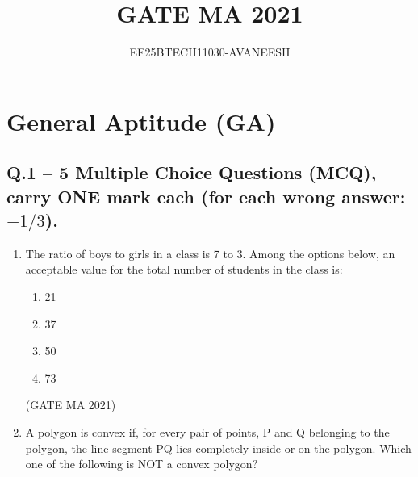 \documentclass[journal,12pt,onecolumn]{IEEEtran}
\title{GATE MA 2021}
\author{EE25BTECH11030-AVANEESH}
\theoremstyle{remark}
\begin{document}
\maketitle

\section*{General Aptitude (GA)}
\subsection*{Q.1 -- 5 Multiple Choice Questions (MCQ), carry ONE mark each (for each wrong answer: $-1/3$).}
\begin{enumerate}
    \item The ratio of boys to girls in a class is 7 to 3. Among the options below, an acceptable value for the total number of students in the class is:
    \begin{enumerate}
        \item 21
        \item 37
        \item 50
        \item 73
    \end{enumerate}
    \hfill(GATE MA 2021)
    \item A polygon is convex if, for every pair of points, P and Q belonging to the polygon, the line segment PQ lies completely inside or on the polygon. Which one of the following is NOT a convex polygon?
\end{enumerate}
\end{document}
